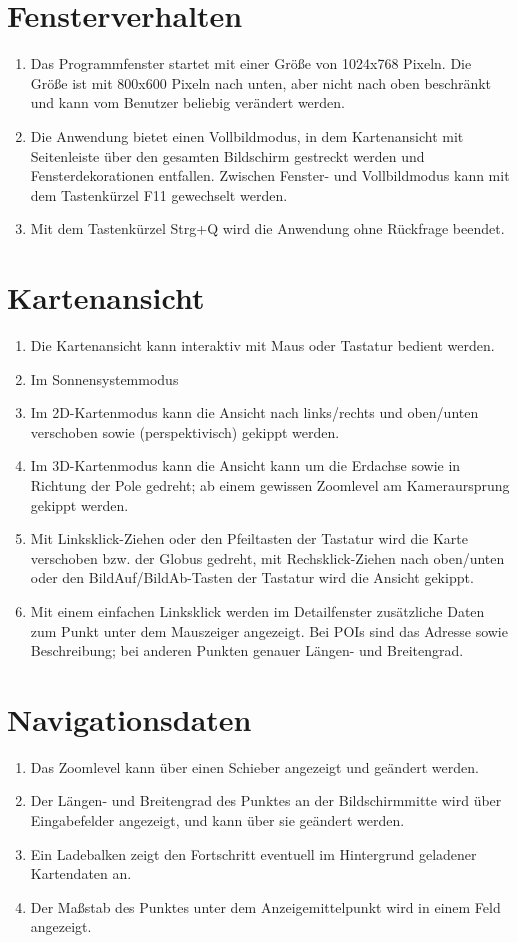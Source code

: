 \documentclass[10pt]{scrreprt}
\begin{document}
\renewcommand{\labelenumi}{\textbf{/F\numprint{\theenumi}0/}}

\section{Fensterverhalten}
\begin{enumerate}[leftmargin=2cm]
\item Das Programmfenster startet mit einer Größe von 1024x768 Pixeln. Die Größe ist mit 800x600 Pixeln nach unten, aber nicht nach oben beschränkt und kann vom Benutzer beliebig  verändert werden.
\item Die Anwendung bietet einen Vollbildmodus, in dem Kartenansicht mit Seitenleiste über den gesamten Bildschirm gestreckt werden und Fensterdekorationen entfallen. Zwischen Fenster- und Vollbildmodus kann mit dem Tastenkürzel F11 gewechselt werden.
\item Mit dem Tastenkürzel Strg+Q wird die Anwendung ohne Rückfrage beendet.
\end{enumerate}
\section{Kartenansicht}
\begin{enumerate}[leftmargin=2cm,resume]
\item Die Kartenansicht kann interaktiv mit Maus oder Tastatur bedient werden.
\item Im Sonnensystemmodus 
\item Im 2D-Kartenmodus kann die Ansicht nach links/rechts und oben/unten verschoben sowie (perspektivisch) gekippt werden. 
\item Im 3D-Kartenmodus kann die Ansicht kann um die Erdachse sowie in Richtung der Pole gedreht; ab einem gewissen Zoomlevel am Kameraursprung gekippt werden.
\item Mit Linksklick-Ziehen oder den Pfeiltasten der Tastatur wird die Karte verschoben bzw. der Globus gedreht, mit Rechsklick-Ziehen nach oben/unten oder den BildAuf/BildAb-Tasten der Tastatur wird die Ansicht gekippt.
\item Mit einem einfachen Linksklick werden im Detailfenster zusätzliche Daten zum Punkt unter dem Mauszeiger angezeigt. Bei POIs sind das Adresse sowie Beschreibung; bei anderen Punkten genauer Längen- und Breitengrad.
\end{enumerate}
\section{Navigationsdaten}
\begin{enumerate}[leftmargin=2cm,resume]
\item Das Zoomlevel kann über einen Schieber angezeigt und geändert werden.
\item Der Längen- und Breitengrad des Punktes an der Bildschirmmitte wird über Eingabefelder angezeigt, und kann über sie geändert werden.
\item Ein Ladebalken zeigt den Fortschritt eventuell im Hintergrund geladener Kartendaten an.
\item Der Maßstab des Punktes unter dem Anzeigemittelpunkt wird in einem Feld angezeigt.
\end{enumerate}
\end{document}
